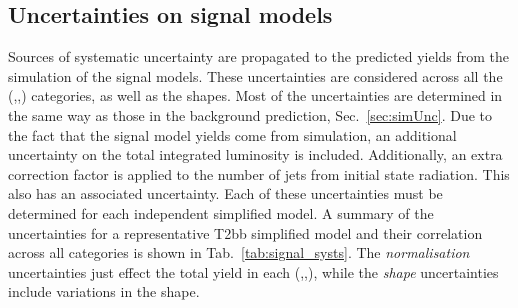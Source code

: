 
\subsection{Uncertainties on signal models}

Sources of systematic uncertainty are propagated to the predicted
yields from the \MC simulation of the signal models. These
uncertainties are considered across all the (\HT,\nj,\nb) categories,
as well as the \MHT shapes. Most of the uncertainties are determined
in the same way as those in the \SM background prediction,
Sec.~\ref{sec:simUnc}. Due to the fact that the signal model yields come from
simulation, an additional uncertainty on the total integrated
luminosity is included. Additionally, an extra correction factor is
applied to the number of jets from initial state radiation. This also
has an associated uncertainty. Each of these uncertainties must be
determined for each independent simplified model. A summary of the
uncertainties for a representative T2bb simplified model and their
correlation across all categories is shown in
Tab.~\ref{tab:signal_systs}. The \emph{normalisation} uncertainties
just effect the total yield in each (\HT,\nj,\nb), while the
\emph{shape} uncertainties include variations in the \MHT shape.  

